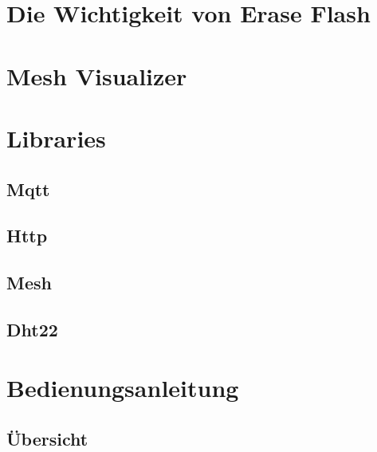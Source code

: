 \section{Die Wichtigkeit von Erase Flash}

\section{Mesh Visualizer}\label{sec:mesh-visualizer}

\section{Libraries}

\subsection{Mqtt}
\subsection{Http}
\subsection{Mesh}
\subsection{Dht22}

\section{Bedienungsanleitung}

\subsection{Übersicht}


